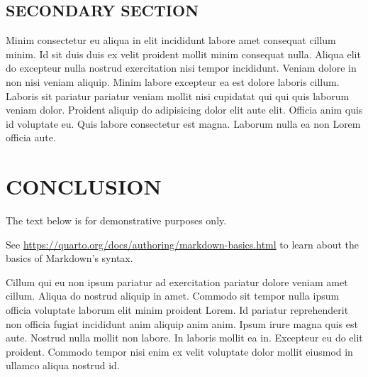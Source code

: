 \documentclass[
  12pt,
  a4paper,
  oneside]{tesesusp}
\begin{document}
\hypertarget{secondary-section-1}{%
\section{SECONDARY SECTION}\label{secondary-section-1}}

Minim consectetur eu aliqua in elit incididunt labore amet consequat
cillum minim. Id sit duis duis ex velit proident mollit minim consequat
nulla. Aliqua elit do excepteur nulla nostrud exercitation nisi tempor
incididunt. Veniam dolore in non nisi veniam aliquip. Minim labore
excepteur ea est dolore laboris cillum. Laboris sit pariatur pariatur
veniam mollit nisi cupidatat qui qui quis laborum veniam dolor. Proident
aliquip do adipisicing dolor elit aute elit. Officia anim quis id
voluptate eu. Quis labore consectetur est magna. Laborum nulla ea non
Lorem officia aute.


\hypertarget{conclusion}{%
\chapter{CONCLUSION}\label{conclusion}}

\begin{tcolorbox}[enhanced jigsaw, colback=white, colbacktitle=quarto-callout-important-color!10!white, opacitybacktitle=0.6, title=\textcolor{quarto-callout-important-color}{\faExclamation}\hspace{0.5em}{Important}, titlerule=0mm, bottomtitle=1mm, bottomrule=.15mm, opacityback=0, left=2mm, coltitle=black, breakable, toptitle=1mm, arc=.35mm, colframe=quarto-callout-important-color-frame, rightrule=.15mm, leftrule=.75mm, toprule=.15mm]

The text below is for demonstrative purposes only.

\vspace{5pt}

See \url{https://quarto.org/docs/authoring/markdown-basics.html} to
learn about the basics of Markdown's syntax.

\end{tcolorbox}

\vspace{10pt}

Cillum qui eu non ipsum pariatur ad exercitation pariatur dolore veniam
amet cillum. Aliqua do nostrud aliquip in amet. Commodo sit tempor nulla
ipsum officia voluptate laborum elit minim proident Lorem. Id pariatur
reprehenderit non officia fugiat incididunt anim aliquip anim anim.
Ipsum irure magna quis est aute. Nostrud nulla mollit non labore. In
laboris mollit ea in. Excepteur eu do elit proident. Commodo tempor nisi
enim ex velit voluptate dolor mollit eiusmod in ullamco aliqua nostrud
id.
\end{document}
